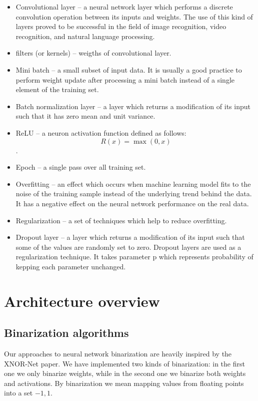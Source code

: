 \documentclass[licencjacka]{pracamgr}
\begin{document}
\begin{itemize}
        \item Convolutional layer -- a neural network layer which performs a discrete convolution operation between its inputs and weights. The use of this kind of layers proved to be successful in the field of image recognition, video recognition, and natural language processing. 	
         
        \item filters (or kernels) -- weigths of convolutional layer.

        \item Mini batch -- a small subset of input data. It is usually a good practice to perform weight update after processing a mini batch instead of a single element of the training set.
        
        \item Batch normalization layer -- a layer which returns a modification of its input such 
        that it has zero mean and unit variance.
        
        \item ReLU -- a neuron activation function defined as follows: $$ R(x) = \max(0,x) $$.
        
        \item Epoch -- a single pass over all training set.
        
        \item Overfitting -- an effect which occurs when machine learning model fits to the noise of the training sample instead of the underlying trend behind the data. It has a negative effect on the neural network performance on the real data.
        
        \item Regularization -- a set of techniques which help to reduce overfitting.
        
        \item Dropout layer -- a layer which returns a modification of its input such that some of the values are randomly set to zero. Dropout layers are used as a regularization technique. It takes parameter p which represents probability of kepping each parameter unchanged.  
    \end{itemize}

\part{Architecture overview}
\chapter{Binarization algorithms}
    Our approaches to neural network binarization are heavily inspired by the XNOR-Net paper. We have implemented two kinds of binarization: in the first one we only binarize weights, while in the second one we binarize both weights and activations. By binarization we mean mapping values from floating points into a set ${-1,1}$.
    
\end{document}
